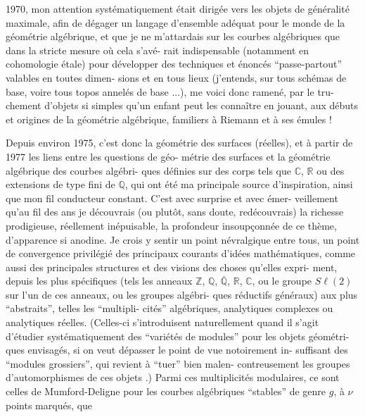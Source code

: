 
1970, mon attention systématiquement était dirigée vers les objets
de généralité maximale, afin de dégager un langage d'ensemble adéquat
pour le monde de la géométrie algébrique, et que je ne m'attardais
sur les courbes algébriques que dans la stricte mesure où cela s'avé-%
rait indispensable (notamment en cohomologie étale) pour développer
des techniques et énoncés ``passe-partout'' valables en toutes dimen-%
sions et en tous lieux (j'entends, sur tous schémas de base, voire
tous topos annelés de base ...), me voici donc ramené, par le tru-%
chement d'objets si simples qu'un enfant peut les connaître en jouant,
aux débuts et origines de la géométrie algébrique, familiers à Riemann
et à ses émules !

Depuis environ 1975, c'est donc la géométrie des surfaces
(réelles), et à partir de 1977 les liens entre les questions de géo-%
métrie des surfaces et la géométrie algébrique des courbes algébri-%
ques définies sur des corps tels que $\mathbb{C}$, $\mathbb{R}$ ou des extensions de type
fini de $\mathbb{Q}$, qui ont été ma principale source d'inspiration, ainsi
que mon fil conducteur constant. C'est avec surprise et avec émer-%
veillement qu'au fil des ans je découvrais (ou plutôt, sans doute,
redécouvrais) la richesse prodigieuse, réellement inépuisable, la
profondeur insoupçonnée de ce thème, d'apparence si anodine. Je crois
y sentir un point névralgique entre tous, un point de convergence
privilégié des principaux courants d'idées mathématiques, comme aussi
des principales structures et des visions des choses qu'elles expri-%
ment, depuis les plus spécifiques (tels les anneaux $\mathbb{Z}$, $\mathbb{Q}$, $\bar{\mathbb{Q}}$, $\mathbb{R}$, $\mathbb{C}$,
ou le groupe $S\ell(2)$ sur l'un de ces anneaux, ou les groupes algébri-%
ques réductifs généraux) aux plus ``abstraits'', telles les ``multipli-%
cités'' algébriques, analytiques complexes ou analytiques réelles.
(Celles-ci s'introduisent naturellement quand il s'agit d'étudier
systématiquement des ``variétés de modules'' pour les objets géométri-%
ques envisagés, si on veut dépasser le point de vue notoirement in-%
suffisant des ``modules grossiers'', qui revient à ``tuer'' bien malen-%
contreusement les groupes d'automorphismes de ces objets .) Parmi ces
multiplicités modulaires, ce sont celles de Mumford-Deligne pour les
courbes algébriques ``stables'' de genre $g$, à $\nu$ points marqués, que

